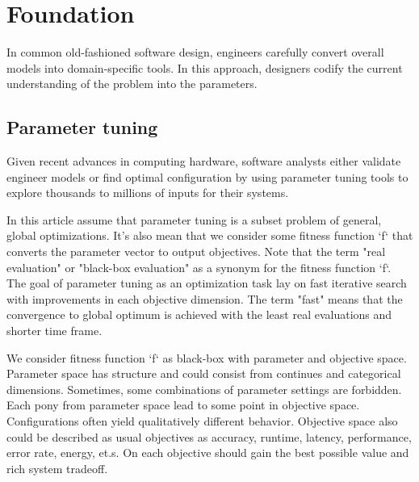 \chapter{Foundation}

    In common old-fashioned software design, engineers carefully convert overall models into domain-specific tools. In this approach, designers codify the current understanding of the problem into the parameters. 

    \section{Parameter tuning}

        Given recent advances in computing hardware, software analysts either validate engineer models or find optimal configuration by using parameter tuning tools to explore thousands to millions of inputs for their systems. 

        In this article assume that parameter tuning is a subset problem of general, global optimizations. It's also mean that we consider some fitness function `f` that converts the parameter vector to output objectives.  Note that the term "real evaluation" or "black-box evaluation" as a synonym for the fitness function `f`.  The goal of parameter tuning as an optimization task lay on fast iterative search with improvements in each objective dimension. The term "fast" means that the convergence to global optimum is achieved with the least real evaluations and shorter time frame.

        We consider fitness function `f` as black-box with parameter and objective space. Parameter space has structure and could consist from continues and categorical dimensions. Sometimes, some combinations of parameter settings are forbidden. Each pony from parameter space lead to some point in objective space. Configurations often yield qualitatively different behavior.
        Objective space also could be described as usual objectives as accuracy, runtime, latency, performance, error rate, energy, et.s. On each objective should gain the best possible value and rich system tradeoff.

